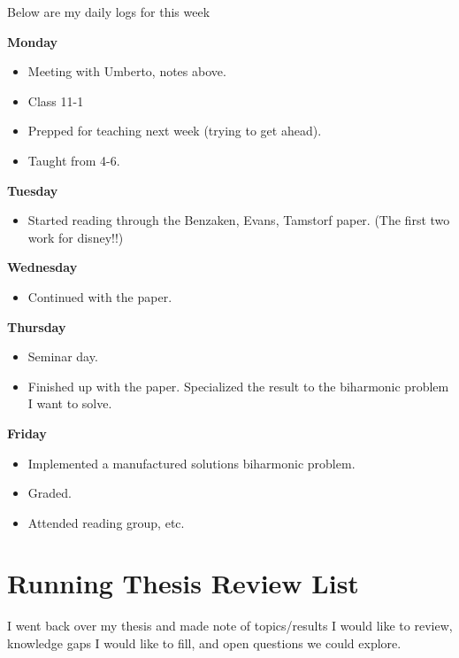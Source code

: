 \documentclass[12pt,a4paper]{article}
\begin{document}
Below are my daily logs for this week
\newline



\textbf{Monday}

\begin{itemize}
    \item Meeting with Umberto, notes above.
    \item Class 11-1
    \item Prepped for teaching next week (trying to get ahead).
    \item Taught from 4-6.
\end{itemize}

\textbf{Tuesday}

\begin{itemize}
\item Started reading through the Benzaken, Evans, Tamstorf paper. (The first two work for disney!!)
\end{itemize}

\textbf{Wednesday}

\begin{itemize}
    \item  Continued with the paper. 
\end{itemize}

\textbf{Thursday}
\begin{itemize}
    \item Seminar day.
    \item Finished up with the paper. Specialized the result to the biharmonic problem I want to solve. 
\end{itemize}

\textbf{Friday}

\begin{itemize}
    \item Implemented a manufactured solutions biharmonic problem. 
    \item Graded.
    \item Attended reading group, etc. 
\end{itemize}




\newpage

\section{Running Thesis Review List}

I went back over my thesis and made note of topics/results I would like to review, knowledge gaps I would like to fill, and open questions we could explore. 
\end{document}
